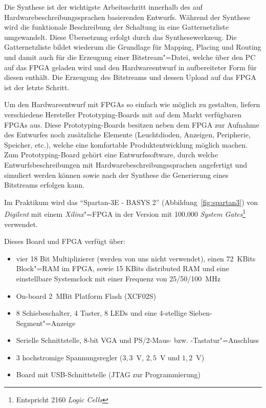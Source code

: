 Die Synthese ist der wichtigste Arbeitsschritt innerhalb des auf Hardwarebeschreibungssprachen basierenden Entwurfs. Während der Synthese wird die funktionale Beschreibung der Schaltung in eine Gatternetzliste umgewandelt. Diese Übersetzung erfolgt durch das Synthesewerkzeug. Die Gatternetzliste bildet wiederum die Grundlage für Mapping, Placing und Routing und damit auch für die Erzeugung einer Bitstream"=Datei, welche über den PC auf das FPGA geladen wird und den Hardwareentwurf in aufbereiteter Form für diesen enthält. Die Erzeugung des Bitstreams und dessen Upload auf das FPGA ist der letzte Schritt.


Um den Hardwareentwurf mit FPGAs so einfach wie möglich zu gestalten, liefern verschiedene Hersteller Prototyping-Boards mit auf dem Markt verfügbaren FPGAs aus. Diese Prototyping-Boards besitzen neben dem  FPGA zur Aufnahme des Entwurfes noch zusätzliche Elemente (Leuchtdioden, Anzeigen, Peripherie, Speicher, etc.), welche eine komfortable Produktentwicklung möglich machen. Zum Prototyping-Board gehört eine Entwurfssoftware, durch welche Entwurfsbeschreibungen mit Hardwarebeschreibungssprachen angefertigt und simuliert werden können sowie nach der Synthese die Generierung eines Bitstreams erfolgen kann. \cite{prototyping_board}


Im Praktikum wird das "`Spartan-3E - BASYS 2"' (Abbildung~\ref{fig:spartan3}) von \textit{Digilent} mit einem \textit{Xilinx}"=FPGA in der Version mit 100.000 \emph{System Gates}\footnote{Entspricht 2160 \emph{Logic Cells}} verwendet.

Dieses Board und FPGA verfügt über:

\begin{itemize}

	\item  vier 18 Bit Multiplizierer (werden von uns nicht verwendet), einen 72~KBits Block"=RAM im FPGA, sowie 15 KBits distributed RAM und eine einstellbare Systemclock mit einer Frequenz von 25/50/100~MHz 

	\item     On-board 2~MBit Platform Flash (XCF02S)

	\item    8 Schiebeschalter, 4 Taster, 8 LEDs und eine 4-stellige Sieben-Segment"=Anzeige

	\item  Serielle Schnittstelle, 8-bit VGA und PS/2-Maus- bzw. -Tastatur"=Anschluss

	\item  3 hochstromige Spannungsregler ($3{,}3$~V, $2{,}5$~V und $1{,}2$~V)

	\item  Board mit USB-Schnittstelle (JTAG zur Programmierung)
\end{itemize}

